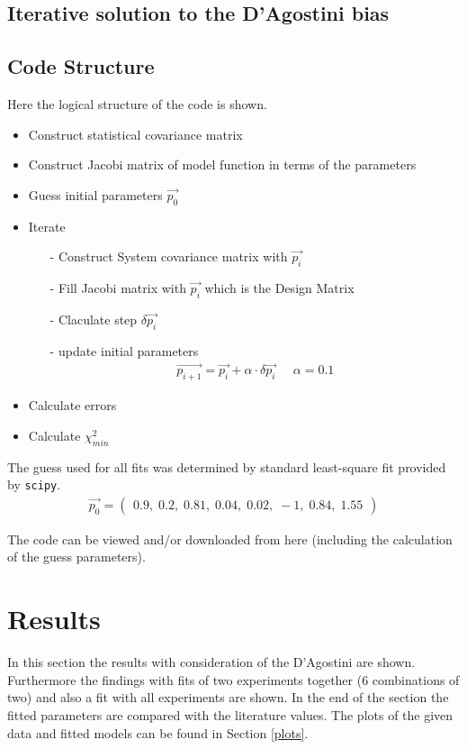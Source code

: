 \documentclass[a4paper]{article}
\begin{document}
\subsection{Iterative solution to the D'Agostini bias}

\subsection{Code Structure}
Here the logical structure of the code is shown.
\begin{itemize}
    \item Construct statistical covariance matrix
    \item Construct Jacobi matrix of model function in terms of the parameters
    \item Guess initial parameters $\vec{p_0}$
    \item Iterate
        \begin{itemize}
            \item[-] Construct System covariance matrix with $\vec{p_{i}}$
            \item[-] Fill Jacobi matrix with $\vec{p_{i}}$ which is the Design Matrix
            \item[-] Claculate step $\delta \vec{p_{i}}$
            \item[-] update initial parameters
                \begin{align*}
                    \vec{p_{i+1}} = \vec{p_{i}} + \alpha \cdot \delta \vec{p_{i}} \;\;\;\;\; \alpha = 0.1
                \end{align*}
        \end{itemize}
    \item Calculate errors
    \item Calculate $\chi^2_{min}$
\end{itemize}

The guess used for all fits was determined by standard least-square fit
provided by \texttt{scipy}.
    \begin{align}
            \vec{p_0} =
            \begin{pmatrix}
            0.9,\; 0.2,\; 0.81,\; 0.04,\; 0.02,\; -1,\; 0.84,\; 1.55
            \end{pmatrix}
    \end{align}

The code can be viewed and/or downloaded from here \cite{code} (including the calculation of the guess parameters).


\section{Results}
In this section the results with consideration of the D'Agostini are shown.
Furthermore the findings with fits of two experiments together
(6 combinations of two) and also a fit with all experiments
are shown. In the end of the section the fitted parameters are compared with
the literature values. The plots of the given data and fitted models can be found in Section \ref{plots}.
\end{document}
